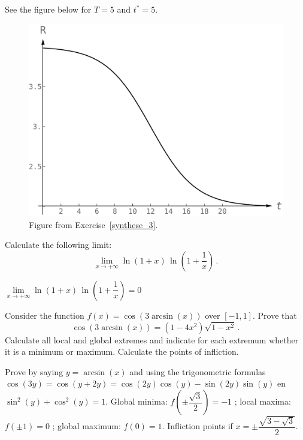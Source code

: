 \begin{Answer}
See the figure below for $T=5$ and $t^*=5$. 
\begin{figure}[H]
    \centerline{
   \includegraphics[scale=0.5]{fig_synthese_3}
    }
    \caption{Figure from Exercise~\ref{synthese_3}.}
    \end{figure}
\end{Answer}



\begin{Exercise}
Calculate the following limit:
$$
\lim\limits_{x\to+\infty}\ln\left(1+x\right)\,\ln\left(1+\dfrac{1}{x}\right)\,.
$$
\end{Exercise}

\begin{Answer}
  $\lim\limits_{x\to+\infty}\ln\left(1+x\right)\,\ln\left(1+\dfrac{1}{x}\right) = 0$  
\end{Answer}


\begin{Exercise} Consider the function $f(x)=\cos(3\arcsin(x))$ over $[-1,1]$.
\Question Prove that
    $$
    \cos(3\arcsin(x))=\left(1-4x^2\right)\sqrt{1-x^2}\,.
    $$
    \Question Calculate all local and global extremes and indicate for each extremum whether it is a minimum or maximum.
    \Question Calculate the points of infliction.
\end{Exercise}

\begin{Answer}
   
 \Question Prove by saying $y=\arcsin(x)$ and using the trigonometric formulas $\cos(3y) = \cos(y+2y) = \cos(2y)\cos(y) - \sin(2y)\sin(y)$ en $\sin^2(y)+\cos^2(y)=1$.
\Question Global minima: $f\left(\pm\dfrac{\sqrt{3}}{2}\right)=-1$ ; local maxima: $f(\pm 1)=0$ ; global maximum: $f(0)=1$.
\Question Infliction points if $x=\pm\dfrac{\sqrt{3-\sqrt{3}}}{2}$.

\end{Answer}


